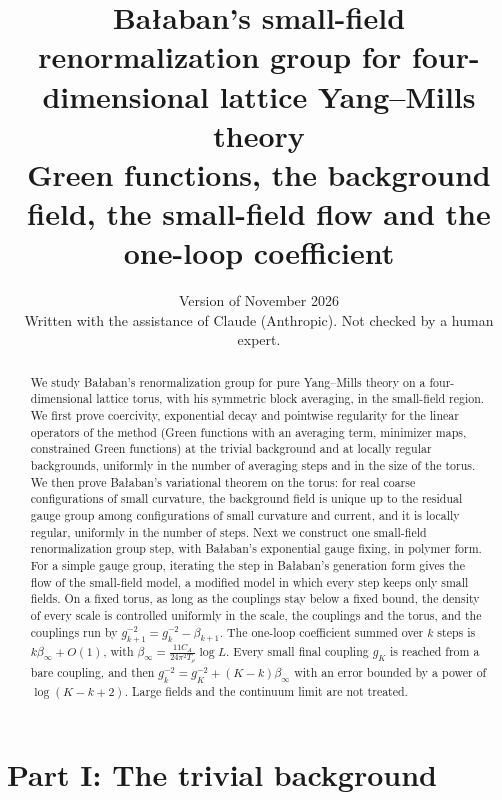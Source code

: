 \documentclass[11pt,a4paper]{article}
\title{\textbf{Ba\l aban's small-field renormalization group for four-dimensional lattice Yang--Mills theory}\\[6pt]
\large Green functions, the background field, the small-field flow and the one-loop coefficient}
\author{}
\date{Version of November 2026\\[6pt]
\small Written with the assistance of Claude (Anthropic). Not checked by a human expert.}
\numberwithin{equation}{section}
\theoremstyle{definition}
\theoremstyle{remark}
\begin{document}
\maketitle

\begin{abstract}
We study Ba\l aban's renormalization group for pure Yang--Mills theory on a four-dimensional lattice torus, with his symmetric block averaging, in the small-field region. We first prove coercivity, exponential decay and pointwise regularity for the linear operators of the method (Green functions with an averaging term, minimizer maps, constrained Green functions) at the trivial background and at locally regular backgrounds, uniformly in the number of averaging steps and in the size of the torus. We then prove Ba\l aban's variational theorem on the torus: for real coarse configurations of small curvature, the background field is unique up to the residual gauge group among configurations of small curvature and current, and it is locally regular, uniformly in the number of steps. Next we construct one small-field renormalization group step, with Ba\l aban's exponential gauge fixing, in polymer form. For a simple gauge group, iterating the step in Ba\l aban's generation form gives the flow of the small-field model, a modified model in which every step keeps only small fields. On a fixed torus, as long as the couplings stay below a fixed bound, the density of every scale is controlled uniformly in the scale, the couplings and the torus, and the couplings run by $g_{k+1}^{-2}=g_k^{-2}-\beta_{k+1}$. The one-loop coefficient summed over $k$ steps is $k\beta_\infty+O(1)$, with $\beta_\infty=\frac{11C_A}{24\pi^2T_\rho}\log L$. Every small final coupling $g_K$ is reached from a bare coupling, and then $g_k^{-2}=g_K^{-2}+(K-k)\beta_\infty$ with an error bounded by a power of $\log(K-k+2)$. Large fields and the continuum limit are not treated.
\end{abstract}

\tableofcontents






\part*{Part I: The trivial background}











\end{document}
